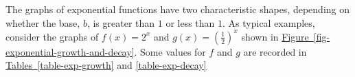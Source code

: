 \documentclass[10pt,]{book}
\theoremstyle{plain}
\theoremstyle{definition}
\theoremstyle{definition}
\theoremstyle{definition}
\theoremstyle{definition}
\theoremstyle{definition}
\numberwithin{equation}{section}
\newcommand{\hrulethin}  {\noalign{\hrule height 0.04em}}
\newcommand{\hrulethick} {\noalign{\hrule height 0.11em}}
\newcounter{figstack}
\newlength\fight
\newcommand\pushValignCaptionBottom[5][b]{%
\stepcounter{figstack}%
\expandafter\def\csname %
figalign\romannumeral\value{figstack}\endcsname{#1}%
\expandafter\def\csname %
figtype\romannumeral\value{figstack}\endcsname{#2}%
\expandafter\def\csname %
figwd\romannumeral\value{figstack}\endcsname{#3}%
\expandafter\def\csname %
figcontent\romannumeral\value{figstack}\endcsname{#4}%
\expandafter\def\csname %
figcap\romannumeral\value{figstack}\endcsname{#5}%
\setbox0=\hbox{%
\begin{#2}{#3}#4\end{#2}}%
\ifdim\dimexpr\ht0+\dp0\relax>\fight\global\setlength{\fight}{%
\dimexpr\ht0+\dp0\relax}\fi%
}
\begin{document}
    The graphs of exponential functions have two characteristic shapes, depending on whether the base, \(b\), is greater than \(1\) or less than \(1\). As typical examples, consider the graphs of \(f (x) = 2^x\) and \(g(x) =\left(\frac{1}{2}\right)^x\) shown in \hyperref[fig-exponential-growth-and-decay]{Figure~\ref{fig-exponential-growth-and-decay}}. Some values for \(f\) and \(g\) are recorded in \hyperref[table-exp-growth]{Tables~\ref{table-exp-growth}} and \hyperref[table-exp-decay]{\ref{table-exp-decay}}
%
\leavevmode%
\end{document}
